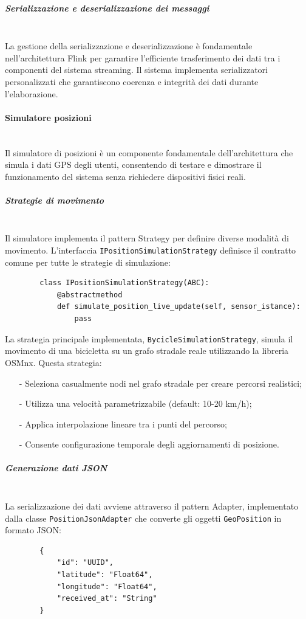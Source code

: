 \documentclass[10pt]{article}
\newcommand{\myparagraph}[1]{\paragraph{#1}\mbox{}\\}
\newcommand{\mysubparagraph}[1]{\subparagraph{#1}\mbox{}\\}
\begin{document}
        \mysubparagraph{Serializzazione e deserializzazione dei messaggi}
        La gestione della serializzazione e deserializzazione è fondamentale nell'architettura Flink per garantire l'efficiente trasferimento dei dati tra i componenti del sistema streaming. Il sistema implementa serializzatori personalizzati che garantiscono coerenza e integrità dei dati durante l'elaborazione.

        \myparagraph{Simulatore posizioni}
        Il simulatore di posizioni è un componente fondamentale dell'architettura che simula i dati GPS degli utenti, consentendo di testare e dimostrare il funzionamento del sistema senza richiedere dispositivi fisici reali.

        \mysubparagraph{Strategie di movimento}
        Il simulatore implementa il pattern Strategy per definire diverse modalità di movimento. L'interfaccia \texttt{IPositionSimulationStrategy} definisce il contratto comune per tutte le strategie di simulazione:
        \begin{lstlisting}
        class IPositionSimulationStrategy(ABC):
            @abstractmethod
            def simulate_position_live_update(self, sensor_istance):
                pass
        \end{lstlisting}

        La strategia principale implementata, \texttt{BycicleSimulationStrategy}, simula il movimento di una bicicletta su un grafo stradale reale utilizzando la libreria OSMnx. Questa strategia:
        \begin{itemize}
            \item[-] Seleziona casualmente nodi nel grafo stradale per creare percorsi realistici;
            \item[-] Utilizza una velocità parametrizzabile (default: 10-20 km/h);
            \item[-] Applica interpolazione lineare tra i punti del percorso;
            \item[-] Consente configurazione temporale degli aggiornamenti di posizione.
        \end{itemize}

        \mysubparagraph{Generazione dati JSON}
        La serializzazione dei dati avviene attraverso il pattern Adapter, implementato dalla classe \texttt{PositionJsonAdapter} che converte gli oggetti \texttt{GeoPosition} in formato JSON:
        \begin{lstlisting}
        {
            "id": "UUID",
            "latitude": "Float64",
            "longitude": "Float64",
            "received_at": "String"
        }
        \end{lstlisting}
\end{document}
